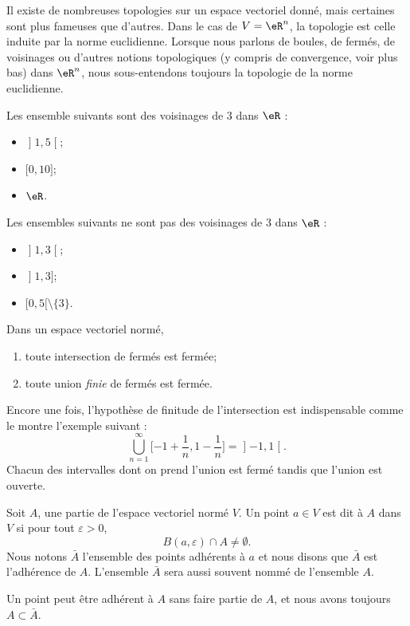 Il existe de nombreuses topologies sur un espace vectoriel donné, mais certaines sont plus fameuses que d'autres. Dans le cas de $V=\eR^n$, la topologie  est celle induite par la norme euclidienne. Lorsque nous parlons de boules, de fermés, de voisinages ou d'autres notions topologiques (y compris de convergence, voir plus bas) dans $\eR^n$, nous sous-entendons toujours la topologie de la norme euclidienne.

\begin{example}
	Les ensemble suivants sont des voisinages de $3$ dans $\eR$ :
	\begin{itemize}
		\item
			$\mathopen] 1 , 5 \mathclose[$;
		\item
			$\mathopen[ 0 , 10 \mathclose]$;
		\item
			$\eR$.
	\end{itemize}
	Les ensembles suivants ne sont pas des voisinages de $3$ dans $\eR$ :
	\begin{itemize}
		\item 
			$\mathopen] 1 , 3 \mathclose[$;
		\item
			$\mathopen] 1 , 3 \mathclose]$;
		\item
			$\mathopen[ 0 , 5 [\setminus\{ 3 \}$.
	\end{itemize}
\end{example}

\begin{proposition}
	Dans un espace vectoriel normé,
	\begin{enumerate}
		\item
			toute intersection de fermés est fermée;
		\item
			toute union \emph{finie} de fermés est fermée.
	\end{enumerate}
\end{proposition}
Encore une fois, l'hypothèse de finitude de l'intersection est indispensable comme le montre l'exemple suivant :
\begin{equation}
	\bigcup_{n=1}^{\infty}\mathopen[ -1+\frac{1}{ n } , 1-\frac{1}{ n } \mathclose]=\mathopen] -1 , 1 \mathclose[.
\end{equation}
Chacun des intervalles dont on prend l'union est fermé tandis que l'union est ouverte.

\begin{definition}
	Soit $A$, une partie de l'espace vectoriel normé $V$. Un point $a\in V$ est dit  à $A$ dans $V$ si pour tout $\varepsilon>0$,
	\begin{equation}
		B(a,\varepsilon)\cap A\neq\emptyset.
	\end{equation}
	Nous notons $\bar A$ l'ensemble des points adhérents à $a$ et nous disons que $\bar A$ est l'adhérence de $A$. L'ensemble $\bar A$ sera aussi souvent nommé  de l'ensemble $A$.
\end{definition}
Un point peut être adhérent à $A$ sans faire partie de $A$, et nous avons toujours $A\subset\bar A$.

